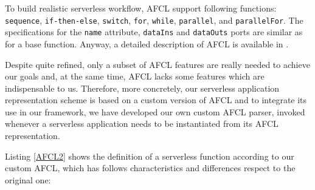 \documentclass[12pt,a4paper]{report}
\begin{document}
To build realistic serverless workflow, AFCL support following functions: \texttt{sequence}, \texttt{if-then-else}, \texttt{switch}, \texttt{for}, \texttt{while}, \texttt{parallel}, and \texttt{parallelFor}. The specifications for the \texttt{name} attribute, \texttt{dataIns} and \texttt{dataOuts} ports are similar as for a base function. Anyway, a detailed description of AFCL is available in \cite{AFCL}.

Despite quite refined, only a subset of AFCL features are really needed to achieve our goals and, at the same time, AFCL lacks some features which are indispensable to us. Therefore, more concretely, our serverless application representation scheme is based on a custom version of AFCL and to integrate its use in our framework, we have developed our own custom AFCL parser, invoked whenever a serverless application needs to be instantiated from its AFCL representation. 

Listing \ref{AFCL2} shows the definition of a serverless function according to our custom AFCL, which has follows characteristics and differences respect to the original one:
\end{document}
